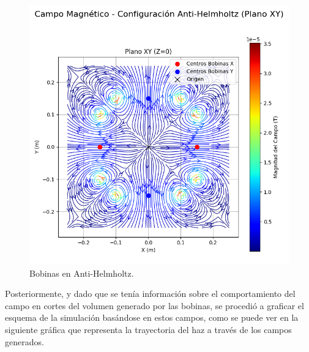 \begin{figure}[H]
\begin{minipage}[b]{0.48\textwidth}
        \includegraphics[width=\linewidth]{Sections/Figures/antihelmholtz_xy_field.png}
        \caption{Bobinas en  Anti-Helmholtz.}
        \label{fig:antihelmholtz_xy_field}
    \end{minipage}
    \label{fig:campos_bobinas}
\end{figure}

Posteriormente, y dado que se tenía información sobre el comportamiento del campo en cortes del volumen generado por las bobinas, se procedió a graficar el esquema de la simulación basándose en estos campos, como se puede ver en la siguiente gráfica que representa la trayectoria del haz a través de los campos generados.


